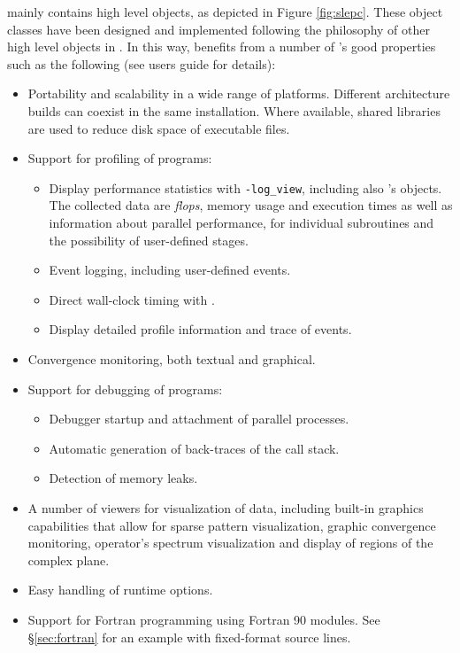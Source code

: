 \slepc mainly contains high level objects, as depicted in Figure \ref{fig:slepc}. These object classes have been designed and implemented following the philosophy of other high level objects in \petsc. In this way, \slepc benefits from a number of \petsc's good properties such as the following (see \petsc{} users guide for details):
\begin{itemize}
\item Portability and scalability in a wide range of platforms. Different architecture builds can coexist in the same installation. Where available, shared libraries are used to reduce disk space of executable files.
\item Support for profiling of programs:
  \begin{itemize}
  \setlength{\itemsep}{0mm}
  \item Display performance statistics with \Verb!-log_view!, including also \slepc's objects. The collected data are \emph{flops}, memory usage and execution times as well as information about parallel performance, for individual subroutines and the possibility of user-defined stages.
  \item Event logging, including user-defined events.
  \item Direct wall-clock timing with .
  \item Display detailed profile information and trace of events.
  \end{itemize}
\item Convergence monitoring, both textual and graphical.
\item Support for debugging of programs:
  \begin{itemize}
  \setlength{\itemsep}{0mm}
  \item Debugger startup and attachment of parallel processes.
  \item Automatic generation of back-traces of the call stack.
  \item Detection of memory leaks.
  \end{itemize}
\item A number of viewers for visualization of data, including built-in graphics capabilities that allow for sparse pattern visualization, graphic convergence monitoring, operator's spectrum visualization and display of regions of the complex plane.
\item Easy handling of runtime options.
\item Support for Fortran programming using Fortran 90 modules. See \S\ref{sec:fortran} for an example with fixed-format source lines.
\end{itemize}

